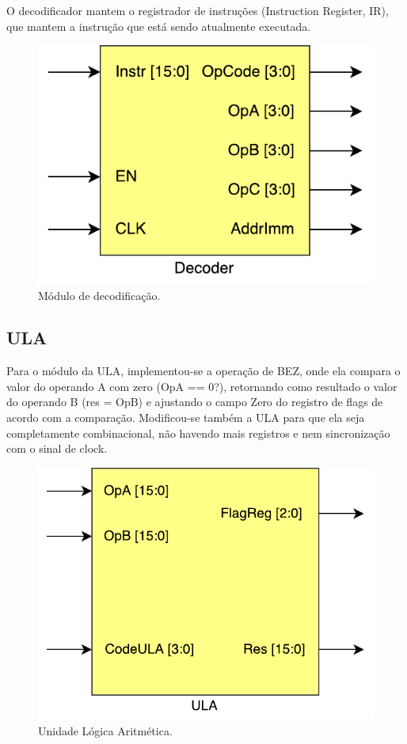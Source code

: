 \documentclass[11pt,a4paper,titlepage]{article}
\begin{document}
O decodificador mantem o registrador de instruções (Instruction Register, IR), que mantem a instrução que está sendo atualmente executada.

\begin{figure}[!h]
\centering
\includegraphics[scale=0.4]{images/Decoder.pdf}
\caption{Módulo de decodificação.}
\label{fig:decoder}
\end{figure}

\subsection{ULA}\label{subsec:imp-ula}

Para o módulo da ULA, implementou-se a operação de BEZ, onde ela compara o valor do operando A com zero (OpA == 0?), retornando como resultado o valor do operando B (res = OpB) e ajustando o campo Zero do registro de flags de acordo com a comparação. Modificou-se também a ULA para que ela seja completamente combinacional, não havendo mais registros e nem sincronização com o sinal de clock.

\begin{figure}[!h]
\centering
\includegraphics[scale=0.4]{images/ULA.pdf}
\caption{Unidade Lógica Aritmética.}
\label{fig:ula}
\end{figure}
\end{document}
